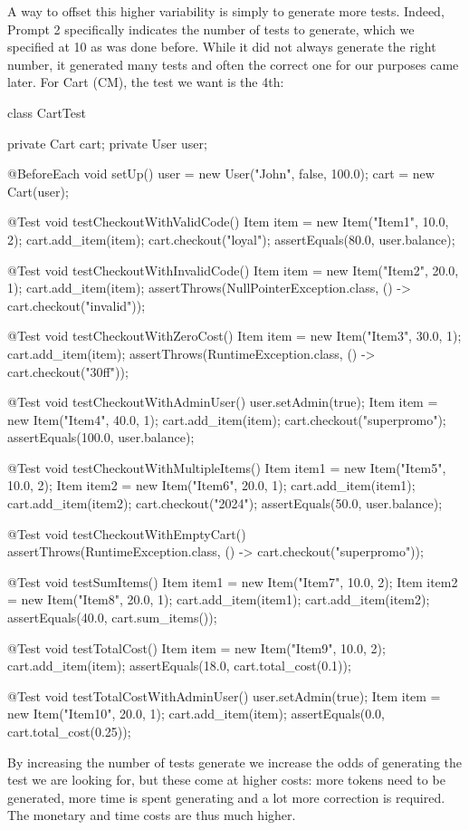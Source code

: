 A way to offset this higher variability is simply to generate more tests. Indeed, Prompt 2 specifically indicates the number of
tests to generate, which we specified at 10 as was done before. While it did not always generate the right number, it generated many
tests and often the correct one for our purposes came later. For Cart (CM), the test we want is the 4th:
\begin{answer}
    class CartTest {

    private Cart cart;
    private User user;

    @BeforeEach
    void setUp() {
        user = new User("John", false, 100.0);
        cart = new Cart(user);
    }

    @Test
    void testCheckoutWithValidCode() {
        Item item = new Item("Item1", 10.0, 2);
        cart.add_item(item);
        cart.checkout("loyal");
        assertEquals(80.0, user.balance);
    }

    @Test
    void testCheckoutWithInvalidCode() {
        Item item = new Item("Item2", 20.0, 1);
        cart.add_item(item);
        assertThrows(NullPointerException.class, () -> cart.checkout("invalid"));
    }

    @Test
    void testCheckoutWithZeroCost() {
        Item item = new Item("Item3", 30.0, 1);
        cart.add_item(item);
        assertThrows(RuntimeException.class, () -> cart.checkout("30ff"));
    }

    @Test
    void testCheckoutWithAdminUser() {
        user.setAdmin(true);
        Item item = new Item("Item4", 40.0, 1);
        cart.add_item(item);
        cart.checkout("superpromo");
        assertEquals(100.0, user.balance);
    }

    @Test
    void testCheckoutWithMultipleItems() {
        Item item1 = new Item("Item5", 10.0, 2);
        Item item2 = new Item("Item6", 20.0, 1);
        cart.add_item(item1);
        cart.add_item(item2);
        cart.checkout("2024");
        assertEquals(50.0, user.balance);
    }

    @Test
    void testCheckoutWithEmptyCart() {
        assertThrows(RuntimeException.class, () -> cart.checkout("superpromo"));
    }

    @Test
    void testSumItems() {
        Item item1 = new Item("Item7", 10.0, 2);
        Item item2 = new Item("Item8", 20.0, 1);
        cart.add_item(item1);
        cart.add_item(item2);
        assertEquals(40.0, cart.sum_items());
    }

    @Test
    void testTotalCost() {
        Item item = new Item("Item9", 10.0, 2);
        cart.add_item(item);
        assertEquals(18.0, cart.total_cost(0.1));
    }

    @Test
    void testTotalCostWithAdminUser() {
        user.setAdmin(true);
        Item item = new Item("Item10", 20.0, 1);
        cart.add_item(item);
        assertEquals(0.0, cart.total_cost(0.25));
    }
}
\end{answer}
By increasing the number of tests generate we increase the odds of generating the test we are looking for,
but these come at higher costs: more tokens need to be generated, more time is spent generating and a lot more
correction is required. The monetary and time costs are thus much higher.

